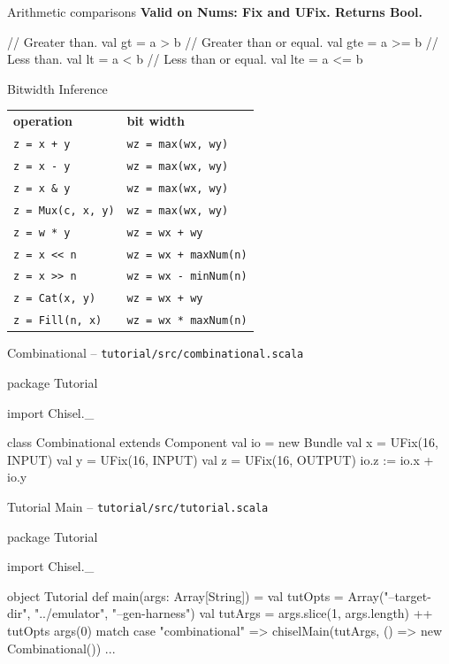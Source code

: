 \documentclass[xcolor=pdflatex,dvipsnames,table]{beamer}
\begin{document}
\begin{frame}[fragile]{Arithmetic comparisons}
\textbf{Valid on Nums: Fix and UFix. Returns Bool.}
\begin{scala}
// Greater than.
val gt  = a > b   
// Greater than or equal.
val gte = a >= b  
// Less than.
val lt  = a < b   
// Less than or equal.
val lte = a <= b  
\end{scala}
\end{frame}

\begin{frame}[fragile]{Bitwidth Inference}
\begin{center}
\begin{tabular}{ll}
{\bf operation} & {\bf bit width} \\ 
\verb|z = x + y| & \verb+wz = max(wx, wy)+ \\
\verb+z = x - y+ & \verb+wz = max(wx, wy)+\\
\verb+z = x & y+ & \verb+wz = max(wx, wy)+ \\
\verb+z = Mux(c, x, y)+ & \verb+wz = max(wx, wy)+ \\
\verb+z = w * y+ & \verb!wz = wx + wy! \\
\verb+z = x << n+ & \verb!wz = wx + maxNum(n)! \\
\verb+z = x >> n+ & \verb+wz = wx - minNum(n)+ \\
\verb+z = Cat(x, y)+ & \verb!wz = wx + wy! \\
\verb+z = Fill(n, x)+ & \verb+wz = wx * maxNum(n)+ \\
\end{tabular}
\end{center}
\end{frame}

\begin{frame}[fragile]{Combinational -- \tt tutorial/src/combinational.scala}
\begin{scala}
package Tutorial {

import Chisel._

class Combinational extends Component {
  val io = new Bundle {
    val x = UFix(16, INPUT)
    val y = UFix(16, INPUT)
    val z = UFix(16, OUTPUT)
  }
  io.z := io.x + io.y
}

}
\end{scala}
\end{frame}

\begin{frame}[fragile]{Tutorial Main -- \tt tutorial/src/tutorial.scala}

\begin{scala}
package Tutorial {

import Chisel._

object Tutorial {
  def main(args: Array[String]) = {
    val tutOpts = Array("--target-dir", "../emulator", "--gen-harness")
    val tutArgs = args.slice(1, args.length) ++ tutOpts
    args(0) match {
      case "combinational" => 
        chiselMain(tutArgs, () => new Combinational())
      ...
    }
  }
}

}
\end{scala}
\end{frame}
\end{document}
